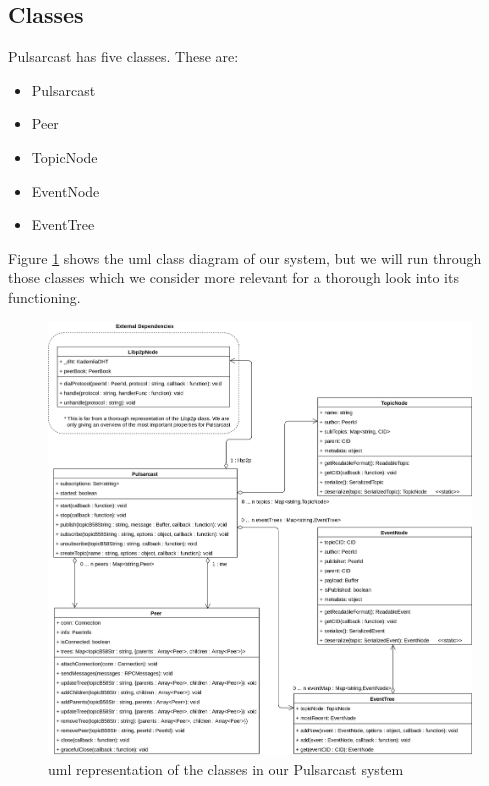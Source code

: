 \subsection{Classes}\label{subsec:classes}

Pulsarcast has five classes. These are:

\begin{itemize}
  \item
    Pulsarcast
  \item
		Peer
  \item
    TopicNode
  \item
    EventNode
  \item
    EventTree
\end{itemize}

Figure \ref{fig:pulsarcast-uml} shows the \acrfull{uml} class diagram of our
system, but we will run through those classes which we consider more relevant
for a thorough look into its functioning.

\begin{figure}[hb!]
  \center
  \includegraphics[width=1\textwidth]{../images/uml-pulsarcast.png}
  \caption{\acrshort{uml} representation of the classes in our Pulsarcast system}
  \label{fig:pulsarcast-uml}
\end{figure}

